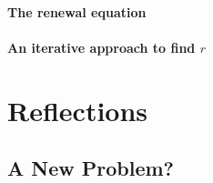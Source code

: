     \subsection{The renewal equation}
      
 
    \subsection{An iterative approach to find $r$}
      
      

\part{Reflections}
  \chapter{A New Problem?}
    


